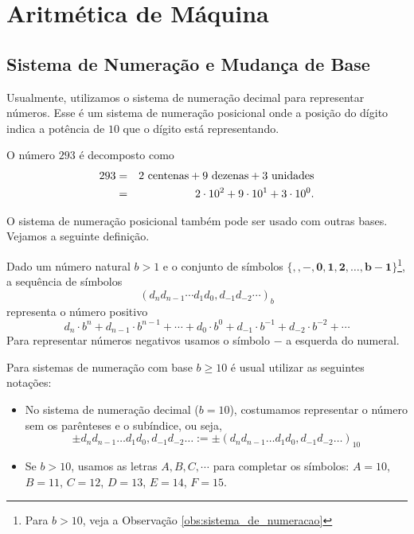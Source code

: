 \documentclass[main.tex]{subfiles}
\begin{document}
\chapter{Aritmética de Máquina}

\section{Sistema de Numeração e Mudança de Base}
Usualmente, utilizamos o sistema de numeração decimal para representar números. Esse é um sistema de numeração posicional onde a posição do dígito indica a potência de $10$ que o dígito está representando.

\begin{ex}
  O número $293$ é decomposto como
  \begin{eqnarray*}
    293&=&2\ \hbox{centenas}+9\ \hbox{dezenas}+3\ \hbox{unidades}\\
    &=&2\cdot 10^2+9\cdot 10^1+3\cdot 10^0.
  \end{eqnarray*}
\end{ex}

O sistema de numeração posicional também pode ser usado com outras bases. Vejamos a seguinte definição.

\begin{defn}\label{def:sistema_de_numeração}
Dado um número natural $b>1$ e o conjunto de símbolos $\{\pmb{,}, \pmb{-},  \pmb{0}, \pmb{1}, \pmb{2},\dotsc, \pmb{b-1}\}$\footnote{Para $b>10$, veja a Observação \ref{obs:sistema_de_numeracao}}, a sequência de símbolos
\begin{equation*}
\left(d_nd_{n-1} \cdots d_1d_0,d_{-1}d_{-2} \cdots \right)_b  
\end{equation*}
representa o número positivo
\begin{equation*}
 d_n\cdot b^n + d_{n-1}\cdot b^{n-1} + \cdots + d_0\cdot b^0 + d_{-1}\cdot b^{-1}+d_{-2}\cdot b^{-2} + \cdots
\end{equation*}
Para representar números negativos usamos o símbolo $-$ a esquerda do numeral.
\end{defn}

\begin{obs}[$b\geq 10$]\label{obs:sistema_de_numeracao}
Para sistemas de numeração com base $b \geq 10$ é usual utilizar as seguintes notações:
\begin{itemize}
\item No sistema de numeração decimal ($b=10$), costumamos representar o número sem os parênteses e o subíndice, ou seja,
\begin{equation*}
  \pm d_nd_{n-1}\ldots d_1d_0,d_{-1}d_{-2}\ldots := \pm (d_nd_{n-1}\ldots d_1d_0,d_{-1}d_{-2}\ldots)_{10}  
\end{equation*}
\item Se $b>10$, usamos as letras $A, B, C, \cdots$ para completar os símbolos: $A=10$, $B=11$, $C=12$, $D=13$, $E=14$, $F=15$.
\end{itemize}
\end{obs}
\end{document}
